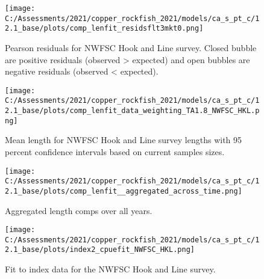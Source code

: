 \documentclass[11pt,
  english,
  a4paper,
]{article}
\begin{document}

\begin{figure}
\centering
\texttt{[image: C:/Assessments/2021/copper\_rockfish\_2021/models/ca\_s\_pt\_c/12.1\_base/plots/comp\_lenfit\_residsflt3mkt0.png]}
\caption{Pearson residuals for NWFSC Hook and Line survey. Closed bubble are positive residuals (observed \textgreater{} expected) and open bubbles are negative residuals (observed \textless{} expected).\label{fig:hkl-pearson}}
\end{figure}

\tagmcend\tagstructend


\begin{figure}
\centering
\texttt{[image: C:/Assessments/2021/copper\_rockfish\_2021/models/ca\_s\_pt\_c/12.1\_base/plots/comp\_lenfit\_data\_weighting\_TA1.8\_NWFSC\_HKL.png]}
\caption{Mean length for NWFSC Hook and Line survey lengths with 95 percent confidence intervals based on current samples sizes.\label{fig:hkl-mean-len-fit}}
\end{figure}

\tagmcend\tagstructend


\begin{figure}
\centering
\texttt{[image: C:/Assessments/2021/copper\_rockfish\_2021/models/ca\_s\_pt\_c/12.1\_base/plots/comp\_lenfit\_\_aggregated\_across\_time.png]}
\caption{Aggregated length comps over all years.\label{fig:agg-len-fit}}
\end{figure}

\tagmcend\tagstructend


\begin{figure}
\centering
\texttt{[image: C:/Assessments/2021/copper\_rockfish\_2021/models/ca\_s\_pt\_c/12.1\_base/plots/index2\_cpuefit\_NWFSC\_HKL.png]}
\caption{Fit to index data for the NWFSC Hook and Line survey.\label{fig:index-fit}}
\end{figure}

\tagmcend\tagstructend

\end{document}
